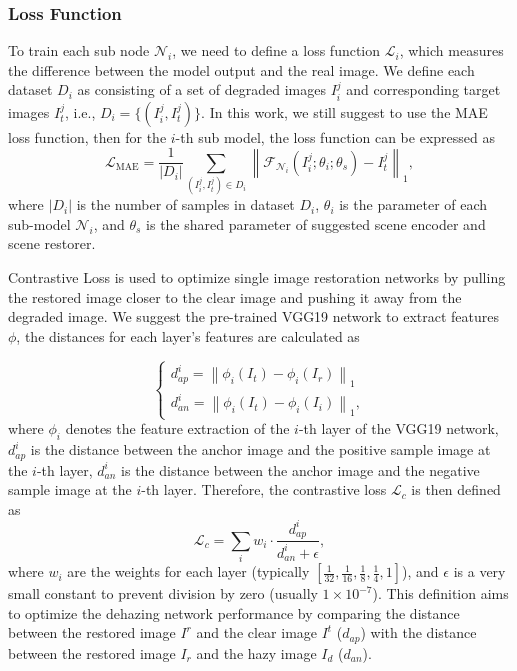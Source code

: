 \documentclass[final,12pt]{elsarticle}
\begin{document}
\subsubsection{Loss Function}
%
    To train each sub node $\mathcal{N}_i$, we need to define a loss function $\mathcal{L}_i$, which measures the difference between the model output and the real image. We define each dataset $D_i$ as consisting of a set of degraded images $I_i^j$ and corresponding target images $I_t^j$, i.e., $D_i=\{(I_i^j, I_{t}^j)\}$. In this work, we still suggest to use the MAE loss function, then for the $i$-th sub model, the loss function can be expressed as
%
    \begin{equation}
        \mathcal{L}_{\text{MAE}}=\frac{1}{\left|D_i\right|} \sum_{\left(I_i^j, I_{t}^j\right) \in D_i}\left\|\mathcal{F}_{\mathcal{N}_i}\left(I_i^j ; \theta_i ; \theta_s\right)-I_{t}^j\right\|_1,
    \end{equation}
    where $\left|D_i\right|$ is the number of samples in dataset $D_i$, $\theta_i$ is the parameter of each sub-model $\mathcal{N}_i$, and $\theta_s$ is the shared parameter of suggested scene encoder and scene restorer.
    
    Contrastive Loss \citep{wu2021contrastive} is used to optimize single image restoration networks by pulling the restored image closer to the clear image and pushing it away from the degraded image. We suggest the pre-trained VGG19 network to extract features $\phi$, the distances for each layer's features are calculated as 

    \begin{equation}   
        \left\{
        \begin{array}{l}
        d_{ap}^i = \left\| \phi_i(I_t) - \phi_i(I_r) \right\|_1 \\
        d_{an}^i = \left\| \phi_i(I_t) - \phi_i(I_i) \right\|_1,
        \end{array}
        \right.
    \end{equation}  
    where $\phi_i$ denotes the feature extraction of the $i$-th layer of the VGG19 network, $d_{ap}^i$ is the distance between the anchor image and the positive sample image at the $i$-th layer, $d_{an}^i$ is the distance between the anchor image and the negative sample image at the $i$-th layer. Therefore, the contrastive loss $\mathcal{L}_{c}$ is then defined as
    \begin{equation}  
        \mathcal{L}_{c} = \sum_{i} w_i \cdot \frac{d_{ap}^i}{d_{an}^i + \epsilon},
    \end{equation}  
     where $w_i$ are the weights for each layer (typically $[ \frac{1}{32}, \frac{1}{16}, \frac{1}{8}, \frac{1}{4}, 1 ]$), and $\epsilon$ is a very small constant to prevent division by zero (usually $1 \times 10^{-7}$). This definition aims to optimize the dehazing network performance by comparing the distance between the restored image $I^r$ and the clear image $I^t$ ($d_{ap}$) with the distance between the restored image $I_r$ and the hazy image $I_d$ ($d_{an}$).
    
\end{document}
